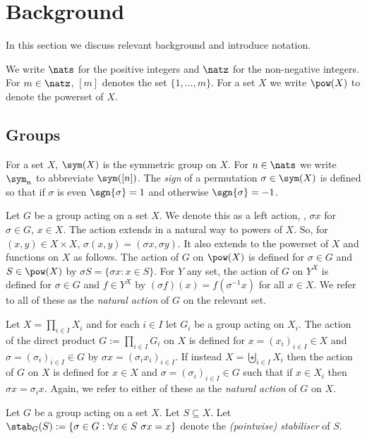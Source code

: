 \documentclass{toc}
\begin{document}
\section{Background}\label{sec:background}

In this section we discuss relevant background and introduce notation.

We write $\nats$ for the positive integers and $\natz$ for the non-negative
integers. For $m \in \natz$, $[m]$ denotes the set $\{1, \ldots, m \}$. For a
set $X$ we write $\pow(X)$ to denote the powerset of $X$.

\subsection{Groups}
For a set $X$, $\sym(X)$ is the symmetric group on $X$. For $n \in \nats$ we
write $\sym_n$ to abbreviate $\sym([n])$. The \emph{sign} of a permutation
$\sigma \in \sym(X)$ is defined so that if $\sigma$ is even $\sgn{\sigma} = 1$
and otherwise $\sgn{\sigma} = -1$.

Let $G$ be a group acting on a set $X$. We denote this as a left action, \ie,
$\sigma x$ for $\sigma \in G$, $x \in X$. The action extends in a natural way to
powers of $X$. So, for $(x,y) \in X \times X$, $\sigma(x,y) = (\sigma x,\sigma
y)$. It also extends to the powerset of $X$ and functions on $X$ as follows. The
action of $G$ on $\pow(X)$ is defined for $\sigma \in G$ and $S \in \pow(X)$ by
$\sigma S = \{\sigma x : x \in S\}$. For $Y$ any set, the action of $G$ on $Y^X$
is defined for $\sigma \in G$ and $f\in Y^X$ by $(\sigma f) (x) = f(\sigma^{-1} x)$
for all $x \in X$. We refer to all of these as the \emph{natural action} of $G$
on the relevant set.

Let $X = \prod_{i \in I} X_i$ and for each $i \in I$ let $G_i$ be a group acting
on $X_i$. The action of the direct product $G := \prod_{i \in I}G_i$ on $X$ is
defined for $x = (x_i)_{i \in I} \in X$ and $\sigma = (\sigma_i)_{i \in I} \in
G$ by $\sigma x = (\sigma_i x_i)_{i \in I}$. If instead $X = \biguplus_{i \in
  I}X_i$ then the action of $G$ on $X$ is defined for $x \in X$ and $\sigma =
(\sigma_i)_{i \in I} \in G$ such that if $x \in X_i$ then $\sigma x = \sigma_i
x$. Again, we refer to either of these as the \emph{natural action} of $G$ on
$X$.

Let $G$ be a group acting on a set $X$. Let $S \subseteq X$. Let $\stab_G(S) :=
\{\sigma \in G : \forall x \in S \,\, \sigma x = x\}$ denote the
\emph{(pointwise) stabiliser} of $S$.
\end{document}
